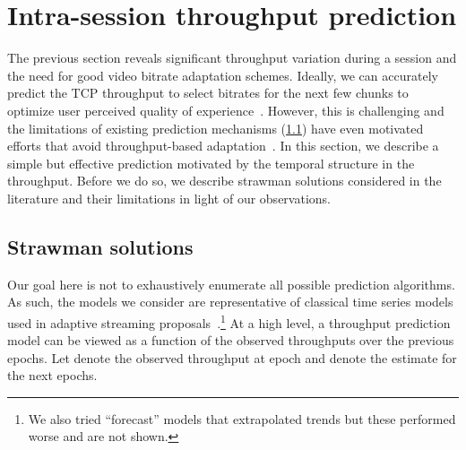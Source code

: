 \section{Intra-session throughput prediction}
\label{sec:premodel}

The previous section reveals  significant throughput variation during a session
and the need for  good video bitrate adaptation schemes.  Ideally, we can
accurately predict the TCP throughput to select bitrates for the next few
chunks to optimize user perceived quality of
experience~\cite{yin2015controlvideo, tian2012towards}. However, this is
challenging and the limitations of existing prediction mechanisms
(\Section\ref{sec:premodel:strawman}) have even motivated efforts that avoid
throughput-based adaptation~\cite{huang2014dash}.  In this section, we describe
a simple but effective prediction motivated by the temporal structure in the
throughput. Before we do so, we describe strawman solutions considered in the
literature and their limitations in light of our observations.


\subsection{Strawman solutions}
\label{sec:premodel:strawman}

Our goal here is not to exhaustively enumerate all possible prediction
algorithms. As such, the models  we consider are representative of classical
time series models used in adaptive streaming
proposals~\cite{yin2015controlvideo, tcppredictability}.\footnote{We also
 tried  ``forecast'' models that extrapolated trends but these
performed worse and are not shown.}  At a high level, a
throughput prediction model can be viewed as a function of the observed
throughputs over the previous   epochs.  Let  denote the  observed
throughput at epoch  and  denote the
estimate for the next  epochs.

